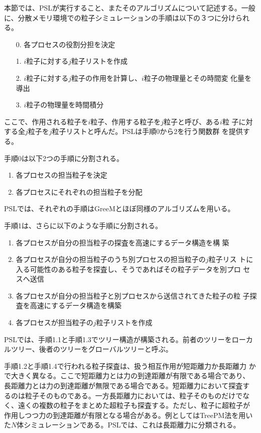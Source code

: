 本節では、PSLが実行すること、またそのアルゴリズムについて記述する。一般
に、分散メモリ環境での粒子シミュレーションの手順は以下の３つに分けられ
る。
\begin{enumerate}
\item[0.] 各プロセスの役割分担を決定 \label{proc:decompexchange}
\item[1.] $i$粒子に対する$j$粒子リストを作成 \label{proc:jlist}
\item[2.] $i$粒子に対する$j$粒子の作用を計算し、$i$粒子の物理量とその時間変
  化量を導出 \label{proc:interact}
\item[3.] $i$粒子の物理量を時間積分 \label{proc:integrate}
\end{enumerate}
ここで、作用される粒子を$i$粒子、作用する粒子を$j$粒子と呼び、ある$i$粒
子に対する全$j$粒子を$j$粒子リストと呼んだ。PSLは手順0から2を行う関数群
を提供する。

手順0は以下2つの手順に分割される。
\begin{enumerate}
\renewcommand{\labelenumi}{0.\arabic{enumi}.}
\item 各プロセスの担当粒子を決定 \label{proc:decomp}
\item 各プロセスにそれぞれの担当粒子を分配 \label{proc:exchange}
\end{enumerate}
PSLでは、それぞれの手順はGreeMとほぼ同様のアルゴリズムを用いる。

手順1は、さらに以下のような手順に分割される。
\begin{enumerate}
\renewcommand{\labelenumi}{1.\arabic{enumi}.}
\item 各プロセスが自分の担当粒子の探査を高速にするデータ構造を構
  築 \label{proc:lstruct}
\item 各プロセスが自分の担当粒子のうち別プロセスの担当粒子の$j$粒子リス
  トに入る可能性のある粒子を探査し、そうであればその粒子データを別プロ
  セスへ送信 \label{proc:communicate}
\item 各プロセスが自分の担当粒子と別プロセスから送信されてきた粒子の粒
  子探査を高速にするデータ構造を構築
  \label{proc:gstruct}
\item 各プロセスが担当粒子の$j$粒子リストを作成 \label{proc:jlistd}
\end{enumerate}

PSLでは、手順1.1と手順1.3でツリー構造が構築される。前者のツリーをローカ
ルツリー、後者のツリーをグローバルツリーと呼ぶ。

手順1.2と手順1.4で行われる粒子探査は、扱う相互作用が短距離力か長距離力
かで大きく異なる。ここで短距離力とは力の到達距離が有限である場合であり、
長距離力とは力の到達距離が無限である場合である。短距離力において探査す
るのは粒子そのものである。一方長距離力においては、粒子そのものだけでな
く、遠くの複数の粒子をまとめた超粒子も探査する。ただし、粒子に超粒子が
作用しつつ力の到達距離が有限となる場合がある。例としてはTreePM法を用い
た$N$体シミュレーションである。PSLでは、これは長距離力に分類される。

